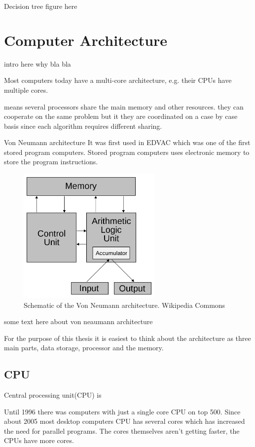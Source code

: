 \documentclass[10pt,a4paper]{report}
\begin{document}
Decision tree figure here %

\clearpage
\section{Computer Architecture} %
intro here why bla bla

Most computers today have a multi-core architecture, e.g. their CPUs have multiple cores.

means several processors share the main memory and other resources. they can cooperate on the same problem but it they are coordinated on a case by case basis since each algorithm requires different sharing.

Von Neumann architecture
It was first used in EDVAC which was one of the first stored program computers\cite{von1993first}. Stored program computers uses electronic memory to store the program instructions\cite{computer_arch_2003}.

\begin{figure}[h]
    \centering
    \includegraphics[width=7cm]{Von_Neumann_architecture.png}
    \caption{Schematic of the Von Neumann architecture. Wikipedia Commons}
    \label{fig:VonNeumann}
\end{figure}

some text here about von neaumann architecture

For the purpose of this thesis it is easiest to think about the architecture as three main parts, data storage, processor and the memory.

\subsection{CPU}
Central processing unit(CPU) is \cite{introduction_hpc_hager}

Until 1996 there was computers with just a single core CPU on top 500\cite{TOP500}. Since about 2005 most desktop computers CPU has several cores which has increased the need for parallel programs. The cores themselves aren't getting faster, the CPUs have more cores.
\end{document}
